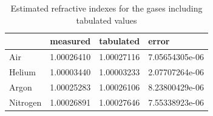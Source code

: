 \begin{table}
  \centering
  \caption{Estimated refractive indexes for the gases including tabulated values}
  \label{tab:refrIndex}
  \begin{tabular}{l|l|l|l}
          & measured & tabulated & error \\ \hline
    Air     & 1.00026410 & 1.00027116 & 7.05654305e-06 \\
    Helium  & 1.00003440 & 1.00003233 & 2.07707264e-06 \\
    Argon   & 1.00025283 & 1.00026106 & 8.23800429e-06 \\
    Nitrogen& 1.00026891 & 1.00027646 & 7.55338923e-06
  \end{tabular}
\end{table}
